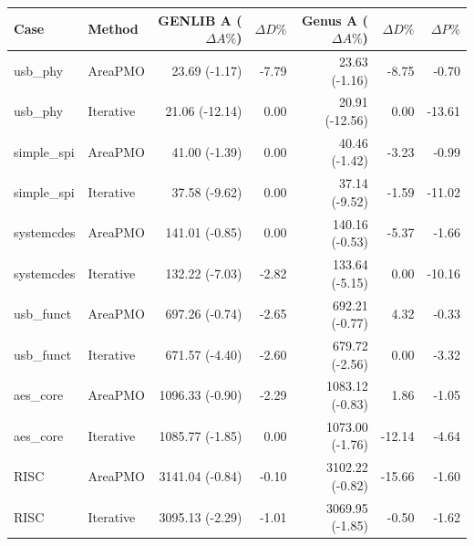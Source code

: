 \begin{tabular}{llrrrrr}
Case & Method & GENLIB A ($\Delta A\%$) & $\Delta D\%$ & Genus A ($\Delta A\%$) & $\Delta D\%$ & $\Delta P\%$ \\
\hline
usb\_phy & AreaPMO & 23.69 (-1.17) & -7.79 & 23.63 (-1.16) & -8.75 & -0.70 \\
usb\_phy & Iterative & 21.06 (-12.14) & 0.00 & 20.91 (-12.56) & 0.00 & -13.61 \\
simple\_spi & AreaPMO & 41.00 (-1.39) & 0.00 & 40.46 (-1.42) & -3.23 & -0.99 \\
simple\_spi & Iterative & 37.58 (-9.62) & 0.00 & 37.14 (-9.52) & -1.59 & -11.02 \\
systemcdes & AreaPMO & 141.01 (-0.85) & 0.00 & 140.16 (-0.53) & -5.37 & -1.66 \\
systemcdes & Iterative & 132.22 (-7.03) & -2.82 & 133.64 (-5.15) & 0.00 & -10.16 \\
usb\_funct & AreaPMO & 697.26 (-0.74) & -2.65 & 692.21 (-0.77) & 4.32 & -0.33 \\
usb\_funct & Iterative & 671.57 (-4.40) & -2.60 & 679.72 (-2.56) & 0.00 & -3.32 \\
aes\_core & AreaPMO & 1096.33 (-0.90) & -2.29 & 1083.12 (-0.83) & 1.86 & -1.05 \\
aes\_core & Iterative & 1085.77 (-1.85) & 0.00 & 1073.00 (-1.76) & -12.14 & -4.64 \\
RISC & AreaPMO & 3141.04 (-0.84) & -0.10 & 3102.22 (-0.82) & -15.66 & -1.60 \\
RISC & Iterative & 3095.13 (-2.29) & -1.01 & 3069.95 (-1.85) & -0.50 & -1.62 \\
\end{tabular}
